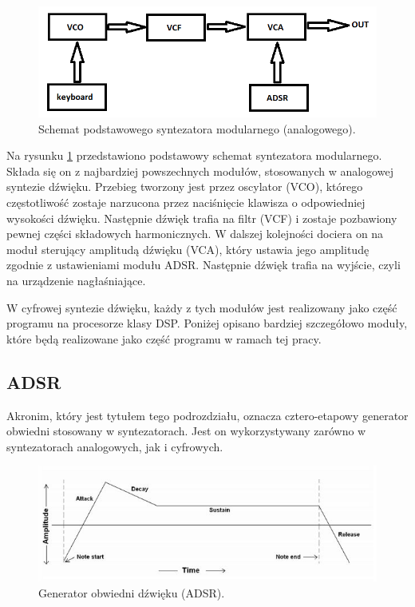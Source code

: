\begin{figure}[H]
	\centering
	\includegraphics[width=12cm]{./grafiki/analog_synth_scheme}
	\captionsetup{justification=centering}
	\caption{Schemat podstawowego syntezatora modularnego (analogowego).}
	\label{rys:analog_scheme}
\end{figure}

Na rysunku \ref{rys:analog_scheme} przedstawiono podstawowy schemat syntezatora modularnego. Składa się on z najbardziej powszechnych modułów, stosowanych w analogowej syntezie dźwięku. Przebieg tworzony jest przez oscylator (VCO), którego częstotliwość zostaje narzucona przez naciśnięcie klawisza o odpowiedniej wysokości dźwięku. Następnie dźwięk trafia na filtr (VCF) i zostaje pozbawiony pewnej części składowych harmonicznych. W dalszej kolejności dociera on na moduł sterujący amplitudą dźwięku (VCA), który ustawia jego amplitudę zgodnie z ustawieniami modułu ADSR. Następnie dźwięk trafia na wyjście, czyli na urządzenie nagłaśniające.

W cyfrowej syntezie dźwięku, każdy z tych modułów jest realizowany jako część programu na procesorze klasy DSP. Poniżej opisano bardziej szczegółowo moduły, które będą realizowane jako część programu w ramach tej pracy.

\subsection{ADSR}
Akronim, który jest tytułem tego podrozdziału, oznacza cztero-etapowy generator obwiedni stosowany w syntezatorach. Jest on wykorzystywany zarówno w syntezatorach analogowych, jak i cyfrowych.

\begin{figure}[H]
	\centering
	\includegraphics[width=15cm]{./grafiki/ADSR}
	\captionsetup{justification=centering}
	\caption{Generator obwiedni dźwięku (ADSR).}
	\label{rys:ADSR}
\end{figure}

